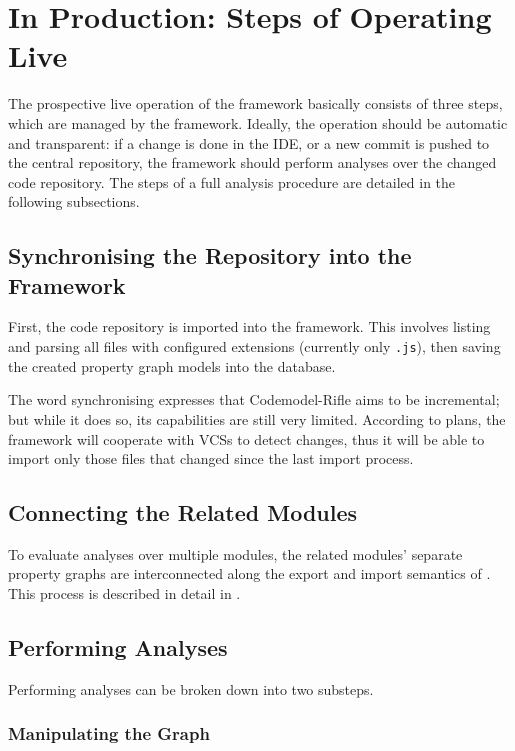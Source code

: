 \section{In Production: Steps of Operating Live}

The prospective live operation of the framework basically consists of three steps, which are managed by the framework. Ideally, the operation should be automatic and transparent: if a change is done in the IDE, or a new commit is pushed to the central repository, the framework should perform analyses over the changed code repository. The steps of a full analysis procedure are detailed in the following subsections.


\subsection{Synchronising the Repository into the Framework}

First, the code repository is imported into the framework. This involves listing and parsing all files with configured extensions (currently only \texttt{.js}), then saving the created property graph models into the database.

The word synchronising expresses that Codemodel-Rifle aims to be incremental; but while it does so, its capabilities are still very limited. According to plans, the framework will cooperate with VCSs to detect changes, thus it will be able to import only those files that changed since the last import process.


\subsection{Connecting the Related \es Modules}

To evaluate analyses over multiple \es modules, the related modules' separate property graphs are interconnected along the export and import semantics of \es. This process is described in detail in .


\subsection{Performing Analyses}

Performing analyses can be broken down into two substeps.


\subsubsection{Manipulating the Graph}

